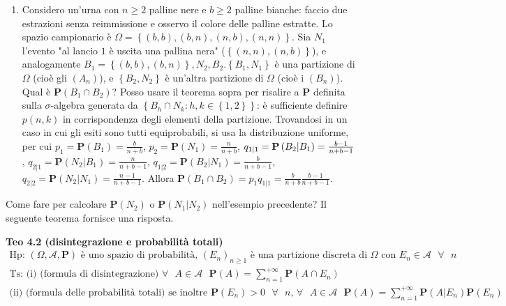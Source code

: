 \documentclass{article}
\begin{document}
\begin{enumerate}
\item Considero un'urna con $n\geq 2$ palline nere e $b\geq 2$ palline
bianche: faccio due estrazioni senza reimmissione e osservo il colore delle
palline estratte. Lo spazio campionario \`{e} $\Omega =\left\{ \left(
b,b\right) ,\left( b,n\right) ,\left( n,b\right) ,\left( n,n\right) \right\} 
$. Sia $N_{1}$ l'evento "al lancio $1$ \`{e} uscita una pallina nera" ($%
\left\{ \left( n,n\right) ,\left( n,b\right) \right\} $), e analogamente $%
B_{1}=\left\{ \left( b,b\right) ,\left( b,n\right) \right\} ,N_{2},B_{2}$.$%
\left\{ B_{1},N_{1}\right\} $ \`{e} una partizione di $\Omega $ (cio\`{e}
gli $\left( A_{n}\right) $), e $\left\{ B_{2},N_{2}\right\} $ \`{e} un'altra
partizione di $\Omega $ (cio\`{e} i $\left( B_{n}\right) $). Qual \`{e} $%
\mathbf{P}\left( B_{1}\cap B_{2}\right) $? Posso usare il teorema sopra per
risalire a $\mathbf{P}$ definita sulla $\sigma $-algebra generata da $%
\left\{ B_{h}\cap N_{k}:h,k\in \left\{ 1,2\right\} \right\} $: \`{e}
sufficiente definire $p\left( n,k\right) $ in corrispondenza degli elementi
della partizione. Trovandosi in un caso in cui gli esiti sono tutti
equiprobabili, si usa la distribuzione uniforme, per cui $p_{1}=\mathbf{P}%
\left( B_{1}\right) =\frac{b}{n+b}$, $p_{2}=\mathbf{P}\left( N_{1}\right) =%
\frac{n}{n+b}$, $q_{1|1}=\mathbf{P}\left( B_{2}|B_{1}\right) =\frac{b-1}{%
n+b-1}$, $q_{2|1}=\mathbf{P}\left( N_{2}|B_{1}\right) =\frac{n}{n+b-1}$, $%
q_{1|2}=\mathbf{P}\left( B_{2}|N_{1}\right) =\frac{b}{n+b-1}$, $q_{2|2}=%
\mathbf{P}\left( N_{2}|N_{1}\right) =\frac{n-1}{n+b-1}$. Allora $\mathbf{P}%
\left( B_{1}\cap B_{2}\right) =p_{1}q_{1|1}=\frac{b}{n+b}\frac{b-1}{n+b-1}$.
\end{enumerate}

Come fare per calcolare $\mathbf{P}\left( N_{2}\right) $ o $\mathbf{P}\left(
N_{1}|N_{2}\right) $ nell'esempio precedente? Il seguente teorema fornisce
una risposta.

\textbf{Teo 4.2 (disintegrazione e probabilit\`{a} totali)}%
\begin{gather*}
\text{Hp: }\left( \Omega ,\mathcal{A},\mathbf{P}\right) \text{ \`{e} uno
spazio di probabilit\`{a}, }\left( E_{n}\right) _{n\geq 1}\text{ \`{e} una
partizione discreta di }\Omega \text{ con }E_{n}\in \mathcal{A}\text{ }%
\forall \text{ }n \\
\text{Ts: (i) (formula di disintegrazione) }\forall \text{ }A\in \mathcal{A}%
\text{ }\mathbf{P}\left( A\right) =\sum_{n=1}^{+\infty }\mathbf{P}\left(
A\cap E_{n}\right) \\
\text{(ii) (formula delle probabilit\`{a} totali) se inoltre }\mathbf{P}%
\left( E_{n}\right) >0\text{ }\forall \text{ }n\text{, }\forall \text{ }A\in 
\mathcal{A}\text{ }\mathbf{P}\left( A\right) =\sum_{n=1}^{+\infty }\mathbf{P}%
\left( A|E_{n}\right) \mathbf{P}\left( E_{n}\right)
\end{gather*}
\end{document}
